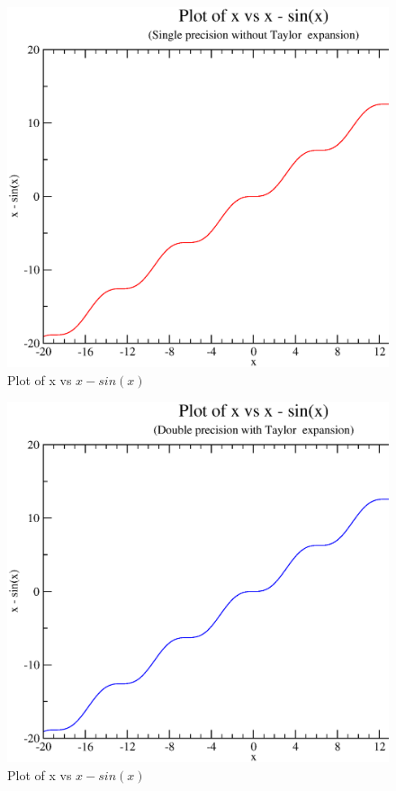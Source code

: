 \documentclass[11pt,a4paper,english]{article}
\begin{document}
	\begin{figure}
	\centering
	\includegraphics[width=1.0\textwidth,left]{./images/ass2qn1Single.eps}
	\caption{Plot of x vs $x - sin(x)$ }
	\end{figure}
	
	
	\begin{figure}
	
	\includegraphics[width=1.0\textwidth,left]{./images/ass2qn1Double.eps}
	\caption{Plot of x vs $x - sin(x)$ }
	\end{figure}
	
\end{document}
